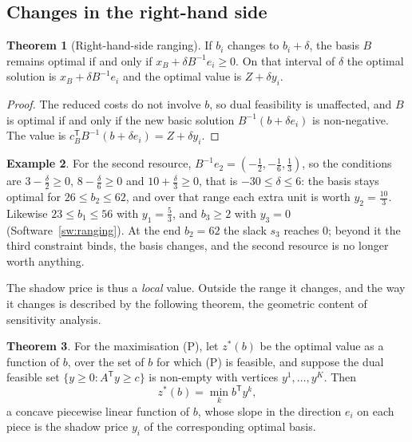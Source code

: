 \documentclass[11pt,a4paper]{article}
\numberwithin{equation}{section}
\theoremstyle{definition}
\newtheorem{thm}{Theorem}[subsection]
\newtheorem{exa}[thm]{Example}
\begin{document}
\subsection{Changes in the right-hand side}
\label{ssec:rhsranging}

\begin{thm}[Right-hand-side ranging]
\label{thm:rhsranging}
If $b_i$ changes to $b_i + \delta$, the basis $B$ remains optimal if and only if $x_B + \delta B^{-1}e_i \geq 0$. On that interval of $\delta$ the optimal solution is $x_B + \delta B^{-1}e_i$ and the optimal value is $Z + \delta y_i$.
\end{thm}

\begin{proof}
The reduced costs do not involve $b$, so dual feasibility is unaffected, and $B$ is optimal if and only if the new basic solution $B^{-1}(b + \delta e_i)$ is non-negative. The value is $c_B^{\mathsf T}B^{-1}(b + \delta e_i) = Z + \delta y_i$.
\end{proof}

\begin{exa}
\label{ex:rhsranging}
For the second resource, $B^{-1}e_2 = (-\frac12, -\frac16, \frac13)$, so the conditions are $3 - \frac\delta2 \geq 0$, $8 - \frac\delta6 \geq 0$ and $10 + \frac\delta3 \geq 0$, that is $-30 \leq \delta \leq 6$: the basis stays optimal for $26 \leq b_2 \leq 62$, and over that range each extra unit is worth
$y_2 = \frac{10}3$. Likewise $23 \leq b_1 \leq 56$ with $y_1 = \frac53$, and $b_3 \geq 2$ with $y_3 = 0$ (Software~\ref{sw:ranging}). At the end $b_2 = 62$ the slack $s_3$ reaches $0$; beyond it the third constraint binds, the basis changes, and the second resource is no longer worth anything.
\end{exa}

The shadow price is thus a \emph{local} value. Outside the range it changes, and the way it changes is described by the following theorem, the geometric content of sensitivity analysis.

\begin{thm}
\label{thm:valuefunction}
For the maximisation (P), let $z^*(b)$ be the optimal value as a function of $b$, over the set of $b$ for which (P) is feasible, and suppose the dual feasible set $\{y \geq 0 : A^{\mathsf T}y \geq c\}$ is non-empty with vertices $y^1, \ldots, y^K$. Then
\[
z^*(b) = \min_kb^{\mathsf T}y^k ,
\]
a concave piecewise linear function of $b$, whose slope in the direction $e_i$ on each piece is the shadow price $y_i$ of the corresponding optimal basis.
\end{thm}
\end{document}
